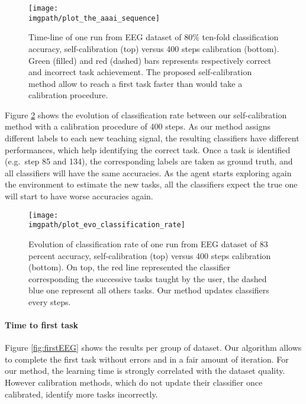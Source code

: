 \begin{figure}[!ht]
\centering
\texttt{[image: \\imgpath/plot\_the\_aaai\_sequence]}
\caption{Time-line of one run from EEG dataset of $80\%$ ten-fold classification accuracy, self-calibration (top) versus 400 steps calibration (bottom). Green (filled) and red (dashed) bars represents respectively correct and incorrect task achievement. The proposed self-calibration method allow to reach a first task faster than would take a calibration procedure.}
\label{fig:sequence}
\end{figure} 



Figure \ref{fig:sequence_evolution} shows the evolution of classification rate between our self-calibration method with a calibration procedure of 400 steps. As our method assigns different labels to each new teaching signal, the resulting classifiers have different performances, which help identifying the correct task. Once a task is identified (e.g.\ step 85 and 134), the corresponding labels are taken as ground truth, and all classifiers will have the same accuracies. As the agent starts exploring again the environment to estimate the new tasks, all the classifiers expect the true one will start to have worse accuracies again.

\begin{figure}[!ht]
\centering
\texttt{[image: \\imgpath/plot\_evo\_classification\_rate]}
\caption{Evolution of classification rate of one run from EEG dataset of 83 percent accuracy, self-calibration (top) versus 400 steps calibration (bottom). On top, the red line represented the classifier corresponding the successive tasks taught by the user, the dashed blue one represent all others tasks. Our method updates classifiers every steps.}
\label{fig:sequence_evolution}
\end{figure} 

\paragraph{Time to first task}

Figure \ref{fig:firstEEG} shows the results per group of dataset. Our algorithm allows to complete the first task without errors and in a fair amount of iteration.  For our method, the learning time is strongly correlated with the dataset quality. However calibration methods, which do not update their classifier once calibrated, identify more tasks incorrectly.

